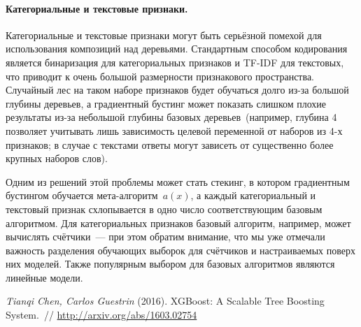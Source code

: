 \documentclass[12pt,fleqn]{article}
\begin{document}
\paragraph{Категориальные и текстовые признаки.}
Категориальные и текстовые признаки могут быть серьёзной помехой для использования композиций над деревьями.
Стандартным способом кодирования является бинаризация для категориальных признаков
и TF-IDF для текстовых, что приводит к очень большой размерности признакового пространства.
Случайный лес на таком наборе признаков будет обучаться долго из-за большой глубины деревьев,
а градиентный бустинг может показать слишком плохие результаты из-за небольшой
глубины базовых деревьев~(например, глубина 4 позволяет учитывать лишь зависимость целевой переменной
от наборов из 4-х признаков; в случае с текстами ответы могут зависеть от существенно более крупных наборов слов).

Одним из решений этой проблемы может стать стекинг, в котором градиентным бустингом обучается мета-алгоритм~$a(x)$,
а каждый категориальный и текстовый признак схлопывается в одно число соответствующим базовым алгоритмом.
Для категориальных признаков базовый алгоритм, например, может вычислять счётчики~---
при этом обратим внимание, что мы уже отмечали важность разделения обучающих выборок
для счётчиков и настраиваемых поверх них моделей.
Также популярным выбором для базовых алгоритмов являются линейные модели.


\begin{thebibliography}{1}
    \emph{Tianqi Chen, Carlos Guestrin} (2016).
    XGBoost: A Scalable Tree Boosting System.~//
    \url{http://arxiv.org/abs/1603.02754}
\end{thebibliography}
\end{document}
